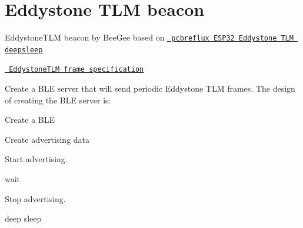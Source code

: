 \chapter{Eddystone TLM beacon}
\hypertarget{md__c_1_2_users_2hatta_2_desktop_2presonal-projects_2security-camera_2esp-idf-vs-ext_2_e_s_p-32-55693e2ccca2a217410c448070fe1da4}{}\label{md__c_1_2_users_2hatta_2_desktop_2presonal-projects_2security-camera_2esp-idf-vs-ext_2_e_s_p-32-55693e2ccca2a217410c448070fe1da4}
\label{md__c_1_2_users_2hatta_2_desktop_2presonal-projects_2security-camera_2esp-idf-vs-ext_2_e_s_p-32-55693e2ccca2a217410c448070fe1da4_autotoc_md17}%
%


Eddystone\+TLM beacon by Bee\+Gee based on \href{https://github.com/pcbreflux/espressif/blob/master/esp32/arduino/sketchbook/ESP32_Eddystone_TLM_deepsleep/ESP32_Eddystone_TLM_deepsleep.ino}{\texttt{ pcbreflux ESP32 Eddystone TLM deepsleep}}

\href{https://github.com/google/eddystone/blob/master/eddystone-tlm/tlm-plain.md}{\texttt{ Eddystone\+TLM frame specification}}

Create a BLE server that will send periodic Eddystone TLM frames. The design of creating the BLE server is\+:
\begin{DoxyEnumerate}
\item Create a BLE 
\item Create advertising data
\item Start advertising.
\item wait
\item Stop advertising.
\item deep sleep 
\end{DoxyEnumerate}